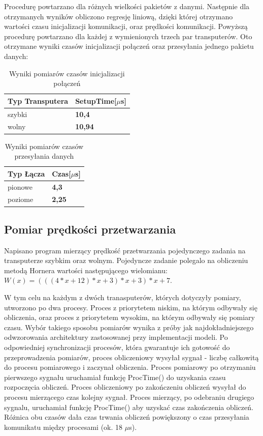 \documentclass[a4paper,11pt, titlepage]{article}
\begin{document}
Procedurę powtarzano dla różnych wielkości pakietów z danymi. Następnie dla otrzymanych wyników obliczono regresję liniową, dzięki której otrzymano wartości czasu inicjalizacji komunikacji, oraz prędkości komunikacji. Powyższą procedurę powtarzano dla każdej z wymienionych trzech par transputerów. Oto otrzymane wyniki czasów inicjalizacji połączeń oraz przesyłania jednego pakietu danych:
\begin{table}[h!]
\begin{tabular}{|l|l|}\hline
Typ Transputera & SetupTime[$\mu$s]\\ \hline
szybki & \textbf{10,4}\\ \hline
wolny & \textbf{10,94}\\ \hline
\end{tabular}
\caption{Wyniki pomiarów czasów inicjalizacji połączeń \label{setuptime}}
\end{table}

\begin{table}[h!]
\begin{tabular}{|l|l|}\hline
Typ Łącza & Czas[$\mu$s]\\ \hline
pionowe & \textbf{4,3}\\ \hline
poziome & \textbf{2,25}\\ \hline
\end{tabular}
\caption{Wyniki pomiarów czasów przesyłania danych \label{comunication}}
\end{table}

\subsection{Pomiar prędkości przetwarzania}
Napisano program mierzący prędkość przetwarzania pojedynczego zadania na transputerze szybkim oraz wolnym. Pojedyncze zadanie polegalo na obliczeniu metodą Hornera wartości następującego wielomianu: $W(x) = (((4*x+12)*x+3)*x+3)*x+7$.

W tym celu na każdym z dwóch tranasputerów, których dotyczyły pomiary, utworzono po dwa procesy. Proces z priorytetem niskim, na którym odbywały się obliczenia, oraz proces z priorytetem wysokim, na którym odbywały się pomiary czasu. Wybór takiego sposobu pomiarów wynika z próby jak najdokładniejszego odwzorowania architektury zastosowanej przy implementacji modeli. Po odpowiedniej synchronizacji procesów, która gwarantuje ich gotowość do przeprowadzenia pomiarów, proces obliczeniowy wysyłał sygnał - liczbę całkowitą do procesu pomiarowego i zaczynał obliczenia.  Proces pomiarowy po otrzymaniu pierwszego sygnału uruchamiał funkcję ProcTime() do uzyskania czasu rozpoczęcia obliczeń. Proces obliczeniowy po zakończeniu obliczeń wysyłał do procesu mierzącego czas kolejny sygnał. Proces mierzący, po odebraniu drugiego sygnalu, uruchamiał funkcję ProcTime() aby uzyskać czas zakończenia obliczeń. Różnica obu czasów dała czas trwania obliczeń powiększony o czas przesyłania komunikatu między procesami (ok. 18 $\mu$s). 
\end{document}
